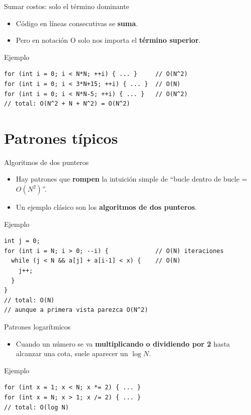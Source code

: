 \documentclass[aspectratio=169]{beamer}
\begin{document}
\begin{frame}[fragile]{Sumar costos: solo el término dominante}
  \begin{itemize}
    \item Código en líneas consecutivas se \textbf{suma}.
    \item Pero en notación O solo nos importa el \textbf{término superior}.
  \end{itemize}
  \begin{block}{Ejemplo}
  \begin{lstlisting}[style=customc]
for (int i = 0; i < N*N; ++i) { ... }     // O(N^2)
for (int i = 0; i < 3*N+15; ++i) { ... }  // O(N)
for (int i = 0; i < N*N-5; ++i) { ... }   // O(N^2)
// total: O(N^2 + N + N^2) = O(N^2)
  \end{lstlisting}
  \end{block}
\end{frame}

\section{Patrones típicos}

\begin{frame}[fragile]{Algoritmos de dos punteros}
  \begin{itemize}
    \item Hay patrones que \textbf{rompen} la intuición simple de “bucle dentro de bucle = \(O(N^2)\)”.
    \item Un ejemplo clásico son los \textbf{algoritmos de dos punteros}.
  \end{itemize}
  \begin{block}{Ejemplo}
  \begin{lstlisting}[style=customc]
int j = 0;
for (int i = N; i > 0; --i) {             // O(N) iteraciones
  while (j < N && a[j] + a[i-1] < x) {    // O(N)
    j++;
  }
}
// total: O(N)
// aunque a primera vista parezca O(N^2)
  \end{lstlisting}
  \end{block}
\end{frame}

\begin{frame}[fragile]{Patrones logarítmicos}
  \begin{itemize}
    \item Cuando un número se va \textbf{multiplicando o dividiendo por 2} hasta alcanzar una cota, suele aparecer un \(\log N\).
  \end{itemize}
  \begin{block}{Ejemplo}
  \begin{lstlisting}[style=customc]
for (int x = 1; x < N; x *= 2) { ... }
for (int x = N; x > 1; x /= 2) { ... }
// total: O(log N)
  \end{lstlisting}
  \end{block}
\end{frame}
\end{document}
